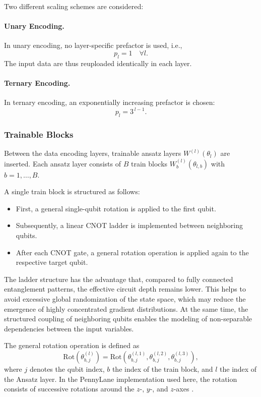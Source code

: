 Two different scaling schemes are considered:

\paragraph{Unary Encoding.}
In unary encoding, no layer-specific prefactor is used, i.e.,
\[
p_l = 1 \quad \forall l.
\]
The input data are thus reuploaded identically in each layer.

\paragraph{Ternary Encoding.}
In ternary encoding, an exponentially increasing prefactor is chosen:
\[
p_l = 3^{\,l-1}.
\]

\subsubsection{Trainable Blocks}

Between the data encoding layers, trainable ansatz layers $W^{(l)}(\theta_l)$ are inserted. Each ansatz layer consists of $B$ train blocks $W^{(l)}_b(\theta_{l,b})$ with $b = 1, \dots, B$.

A single train block is structured as follows:

\begin{itemize}
    \item First, a general single-qubit rotation is applied to the first qubit.
    \item Subsequently, a linear CNOT ladder is implemented between neighboring qubits.
    \item After each CNOT gate, a general rotation operation is applied again to the respective target qubit.
\end{itemize}

The ladder structure has the advantage that, compared to fully connected entanglement patterns, the effective circuit depth remains lower. This helps to avoid excessive global randomization of the state space, which may reduce the emergence of highly concentrated gradient distributions. At the same time, the structured coupling of neighboring qubits enables the modeling of non-separable dependencies between the input variables.

The general rotation operation is defined as
\begin{equation}
\mathrm{Rot}(\theta^{(l)}_{b,j})
=
\mathrm{Rot}\!\left(
\theta^{(l,1)}_{b,j},
\theta^{(l,2)}_{b,j},
\theta^{(l,3)}_{b,j}
\right),
\end{equation}
where $j$ denotes the qubit index, $b$ the index of the train block, and $l$ the index of the Ansatz layer.
In the PennyLane implementation used here, the rotation consists of successive rotations around the $z$-, $y$-, and $z$-axes \cite{pennylane_rot}.

